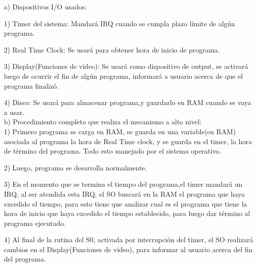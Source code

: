 \documentclass[letter]{article}
\begin{document}
	
	\begin{pregunta}{1} %
	
	a) Dispositivos I/O usados:
	$$ $$
	
	1) Timer del sistema: Mandará IRQ cuando se cumpla plazo límite de algún programa.
	
	2) Real Time Clock: Se usará para obtener hora de inicio de programa.
	
	3) Display(Funciones de video): Se usará como dispositivo de output, se activará luego de ocurrir el fin de algún programa, informará a usuario acerca de que el programa finalizó.
	
	4) Disco: Se usará para almacenar programa,y guardarlo en RAM cuando se vaya a usar.
	$$ $$
	b) Procedimiento completo que realiza el mecanismo a alto nivel:
	$$ $$
	1) Primero programa se carga en RAM, se guarda en una variable(en RAM) asociada al programa la hora de Real Time clock, y se guarda en el timer, la hora de término del programa. Todo esto manejado por el sistema operativo.
	
	2) Luego, programa se desarrolla normalmente.
	
	3) En el momento que se termina el tiempo del programa,el timer mandará un IRQ, al ser atendida esta IRQ, el SO buscará en la RAM el programa que haya excedido el tiempo, para esto tiene que analizar cual es el programa que tiene la hora de inicio que haya excedido el tiempo establecido, para luego dar término al programa ejecutado.
	
	4) Al final de la rutina del S0, activada por  interrupción del timer, el SO realizará cambios en el Display(Funciones de video), para informar al usuario acerca del fin del programa.
	
	$$ $$
	

\end{pregunta}
\end{document}
